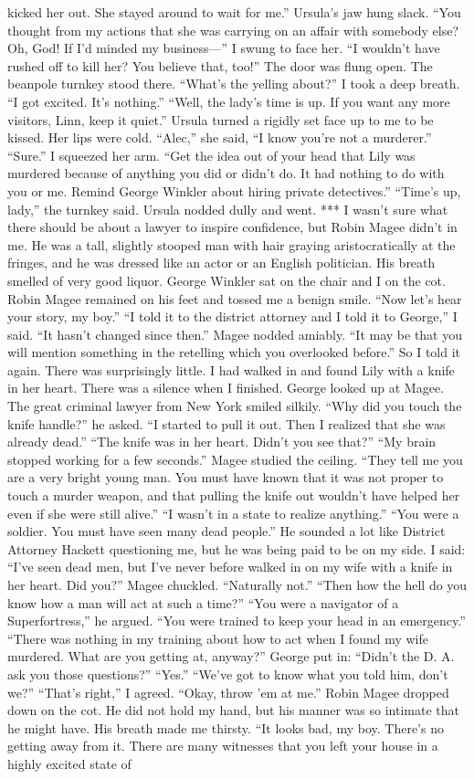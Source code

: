 \documentclass{novel}
\begin{document}
kicked her out. She stayed around to wait for me.” Ursula’s jaw hung slack. “You thought from my actions that she was carrying on an affair with somebody else? Oh, God! If I’d minded my business—” I swung to face her. “I wouldn’t have rushed off to kill her? You believe that, too!” The door was flung open. The beanpole turnkey stood there. “What’s the yelling about?” I took a deep breath. “I got excited. It’s nothing.” “Well, the lady’s time is up. If you want any more visitors, Linn, keep it quiet.” Ursula turned a rigidly set face up to me to be kissed. Her lips were cold. “Alec,” she said, “I know you’re not a murderer.” “Sure.” I squeezed her arm. “Get the idea out of your head that Lily was murdered because of anything you did or didn’t do. It had nothing to do with you or me. Remind George Winkler about hiring private detectives.” “Time’s up, lady,” the turnkey said. Ursula nodded dully and went. *** I wasn’t sure what there should be about a lawyer to inspire confidence, but Robin Magee didn’t in me. He was a tall, slightly stooped man with hair graying aristocratically at the fringes, and he was dressed like an actor or an English politician. His breath smelled of very good liquor. George Winkler sat on the chair and I on the cot. Robin Magee remained on his feet and tossed me a benign smile. “Now let’s hear your story, my boy.” “I told it to the district attorney and I told it to George,” I said. “It hasn’t changed since then.” Magee nodded amiably. “It may be that you will mention something in the retelling which you overlooked before.” So I told it again. There was surprisingly little. I had walked in and found Lily with a knife in her heart. There was a silence when I finished. George looked up at Magee. The great criminal lawyer from New York smiled silkily. “Why did you touch the knife handle?” he asked. “I started to pull it out. Then I realized that she was already dead.” “The knife was in her heart. Didn’t you see that?” “My brain stopped working for a few seconds.” Magee studied the ceiling. “They tell me you are a very bright young man. You must have known that it was not proper to touch a murder weapon, and that pulling the knife out wouldn’t have helped her even if she were still alive.” “I wasn’t in a state to realize anything.” “You were a soldier. You must have seen many dead people.” He sounded a lot like District Attorney Hackett questioning me, but he was being paid to be on my side. I said: “I’ve seen dead men, but I’ve never before walked in on my wife with a knife in her heart. Did you?” Magee chuckled. “Naturally not.” “Then how the hell do you know how a man will act at such a time?” “You were a navigator of a Superfortress,” he argued. “You were trained to keep your head in an emergency.” “There was nothing in my training about how to act when I found my wife murdered. What are you getting at, anyway?” George put in: “Didn’t the D. A. ask you those questions?” “Yes.” “We’ve got to know what you told him, don’t we?” “That’s right,” I agreed. “Okay, throw ’em at me.” Robin Magee dropped down on the cot. He did not hold my hand, but his manner was so intimate that he might have. His breath made me thirsty. “It looks bad, my boy. There’s no getting away from it. There are many witnesses that you left your house in a highly excited state of 
\end{document}
